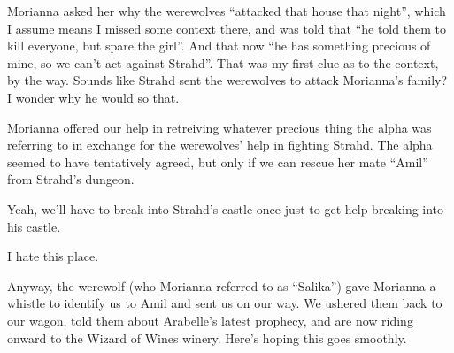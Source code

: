 Morianna asked her why the werewolves ``attacked that house that night'', which I assume means I missed some context there, and was told that ``he told them to kill everyone, but spare the girl''. And that now ``he has something precious of mine, so we can't act against Strahd''. That was my first clue as to the context, by the way. Sounds like Strahd sent the werewolves to attack Morianna's family? I wonder why he would so that.

Morianna offered our help in retreiving whatever precious thing the alpha was referring to in exchange for the werewolves' help in fighting Strahd. The alpha seemed to have tentatively agreed, but only if we can rescue her mate ``Amil'' from Strahd's dungeon.

Yeah, we'll have to break into Strahd's castle once just to get help breaking into his castle.

I hate this place.

Anyway, the werewolf (who Morianna referred to as ``Salika'') gave Morianna a whistle to identify us to Amil and sent us on our way. We ushered them back to our wagon, told them about Arabelle's latest prophecy, and are now riding onward to the Wizard of Wines winery. Here's hoping this goes smoothly.

